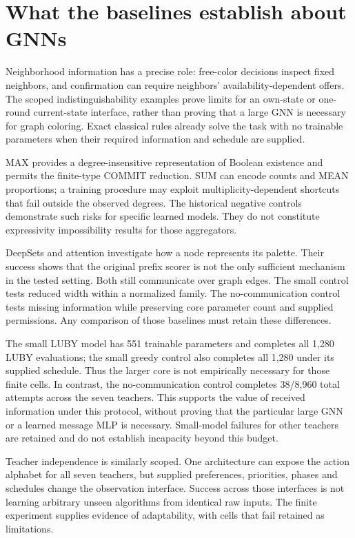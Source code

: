 \documentclass[
  11pt,
]{article}
\begin{document}
\section{What the baselines establish about
GNNs}\label{what-the-baselines-establish-about-gnns}

Neighborhood information has a precise role: free-color decisions
inspect fixed neighbors, and confirmation can require neighbors'
availability-dependent offers. The scoped indistinguishability examples
prove limits for an own-state or one-round current-state interface,
rather than proving that a large GNN is necessary for graph coloring.
Exact classical rules already solve the task with no trainable
parameters when their required information and schedule are supplied.

MAX provides a degree-insensitive representation of Boolean existence
and permits the finite-type COMMIT reduction. SUM can encode counts and
MEAN proportions; a training procedure may exploit
multiplicity-dependent shortcuts that fail outside the observed degrees.
The historical negative controls demonstrate such risks for specific
learned models. They do not constitute expressivity impossibility
results for those aggregators.

DeepSets and attention investigate how a node represents its palette.
Their success shows that the original prefix scorer is not the only
sufficient mechanism in the tested setting. Both still communicate over
graph edges. The small control tests reduced width within a normalized
family. The no-communication control tests missing information while
preserving core parameter count and supplied permissions. Any comparison
of those baselines must retain these differences.

The small LUBY model has 551 trainable parameters and completes all
1,280 LUBY evaluations; the small greedy control also completes all
1,280 under its supplied schedule. Thus the larger core is not
empirically necessary for those finite cells. In contrast, the
no-communication control completes 38/8,960 total attempts across the
seven teachers. This supports the value of received information under
this protocol, without proving that the particular large GNN or a
learned message MLP is necessary. Small-model failures for other
teachers are retained and do not establish incapacity beyond this
budget.

Teacher independence is similarly scoped. One architecture can expose
the action alphabet for all seven teachers, but supplied preferences,
priorities, phases and schedules change the observation interface.
Success across those interfaces is not learning arbitrary unseen
algorithms from identical raw inputs. The finite experiment supplies
evidence of adaptability, with cells that fail retained as limitations.
\end{document}
